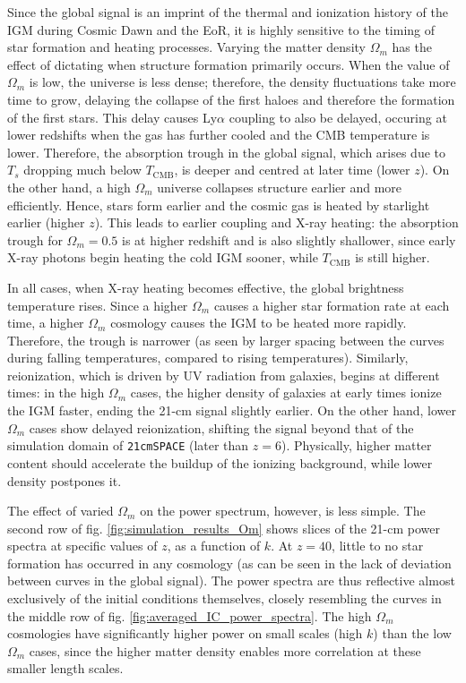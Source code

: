 \documentclass[floats,floatfix,showpacs,amssymb,prd,superscriptaddress,nofootinbib]{revtex4-2} %
\newcommand{\code}{\texttt}
\begin{document}
Since the global signal is an imprint of the thermal and ionization history of the IGM during Cosmic Dawn and the EoR, it is highly sensitive to the timing of star formation and heating processes. Varying the matter density $\Omega_m$ has the effect of dictating when structure formation primarily occurs. When the value of $\Omega_m$ is low, the universe is less dense; therefore, the density fluctuations take more time to grow, delaying the collapse of the first haloes and therefore the formation of the first stars. This delay causes Ly$\alpha$ coupling to also be delayed, occuring at lower redshifts when the gas has further cooled and the CMB temperature is lower. Therefore, the absorption trough in the global signal, which arises due to $T_s$ dropping much below $T_\text{CMB}$, is deeper and centred at later time (lower $z$). On the other hand, a high $\Omega_m$ universe collapses structure earlier and more efficiently. Hence, stars form earlier and the cosmic gas is heated by starlight earlier (higher $z$). This leads to earlier coupling and X-ray heating: the absorption trough for $\Omega_m = 0.5$ is at higher redshift and is also slightly shallower, since early X-ray photons begin heating the cold IGM sooner, while $T_\text{CMB}$ is still higher. 

In all cases, when X-ray heating becomes effective, the global brightness temperature rises. Since a higher $\Omega_m$ causes a higher star formation rate at each time, a higher $\Omega_m$ cosmology causes the IGM to be heated more rapidly. Therefore, the trough is narrower (as seen by larger spacing between the curves during falling temperatures, compared to rising temperatures). Similarly, reionization, which is driven by UV radiation from galaxies, begins at different times: in the high $\Omega_m$ cases, the higher density of galaxies at early times ionize the IGM faster, ending the 21-cm signal slightly earlier. On the other hand, lower $\Omega_m$ cases show delayed reionization, shifting the signal beyond that of the simulation domain of \code{21cmSPACE} (later than $z = 6$). Physically, higher matter content should accelerate the buildup of the ionizing background, while lower density postpones it.

The effect of varied $\Omega_m$ on the power spectrum, however, is less simple. The second row of fig. \ref{fig:simulation_results_Om} shows slices of the 21-cm power spectra at specific values of $z$, as a function of $k$. At $z = 40$, little to no star formation has occurred in any cosmology (as can be seen in the lack of deviation between curves in the global signal). The power spectra are thus reflective almost exclusively of the initial conditions themselves, closely resembling the curves in the middle row of fig. \ref{fig:averaged_IC_power_spectra}.
The high $\Omega_m$ cosmologies have significantly higher power on small scales (high $k$) than the low $\Omega_m$ cases, since the higher matter density enables more correlation at these smaller length scales. 
\end{document}
